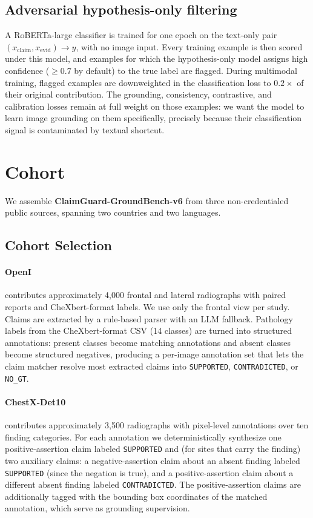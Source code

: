 \documentclass[pmlr]{jmlr}
\begin{document}
\subsection{Adversarial hypothesis-only filtering}

A RoBERTa-large classifier is trained for one epoch on the text-only pair $(x_{\text{claim}}, x_{\text{evid}}) \to y$, with no image input. Every training example is then scored under this model, and examples for which the hypothesis-only model assigns high confidence ($\geq 0.7$ by default) to the true label are flagged. During multimodal training, flagged examples are downweighted in the classification loss to $0.2\times$ of their original contribution. The grounding, consistency, contrastive, and calibration losses remain at full weight on those examples: we want the model to learn image grounding on them specifically, precisely because their classification signal is contaminated by textual shortcut.

\section{Cohort}

We assemble \textbf{ClaimGuard-GroundBench-v6} from three non-credentialed public sources, spanning two countries and two languages.

\subsection{Cohort Selection}

\paragraph{OpenI} \citep{demner2016preparing} contributes approximately 4{,}000 frontal and lateral radiographs with paired reports and CheXbert-format labels. We use only the frontal view per study. Claims are extracted by a rule-based parser with an LLM fallback. Pathology labels from the CheXbert-format CSV (14 classes) are turned into structured annotations: present classes become matching annotations and absent classes become structured negatives, producing a per-image annotation set that lets the claim matcher resolve most extracted claims into \texttt{SUPPORTED}, \texttt{CONTRADICTED}, or \texttt{NO\_GT}.

\paragraph{ChestX-Det10} \citep{liu2020chestxdet10} contributes approximately 3{,}500 radiographs with pixel-level annotations over ten finding categories. For each annotation we deterministically synthesize one positive-assertion claim labeled \texttt{SUPPORTED} and (for sites that carry the finding) two auxiliary claims: a negative-assertion claim about an absent finding labeled \texttt{SUPPORTED} (since the negation is true), and a positive-assertion claim about a different absent finding labeled \texttt{CONTRADICTED}. The positive-assertion claims are additionally tagged with the bounding box coordinates of the matched annotation, which serve as grounding supervision.
\end{document}
